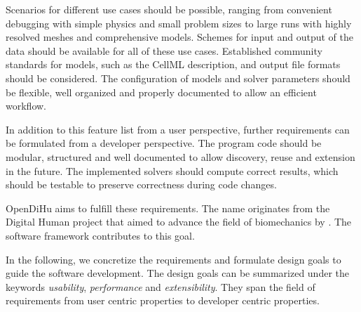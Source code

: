 Scenarios for different use cases should be possible, ranging from convenient debugging with simple physics and small problem sizes to large runs with highly resolved meshes and comprehensive models. Schemes for input and output of the data should be available for all of these use cases. Established community standards for models, such as the CellML description, and output file formats should be considered.
The configuration of models and solver parameters should be flexible, well organized and properly documented to allow an efficient workflow.


In addition to this feature list from a user perspective, further requirements can be formulated from a developer perspective.
The program code should be modular, structured and well documented to allow discovery, reuse and extension in the future. The implemented solvers should compute correct results, which should be testable to preserve correctness during code changes.

OpenDiHu aims to fulfill these requirements.
The name originates from the Digital Human project that aimed to advance the field of biomechanics by  \cite{DihuWeb}. The software framework contributes to this goal.

In the following, we concretize the requirements and formulate design goals to guide the software development.
The design goals can be summarized under the keywords \emph{usability}, \emph{performance} and \emph{extensibility}. They span the field of requirements from user centric properties to developer centric properties.

